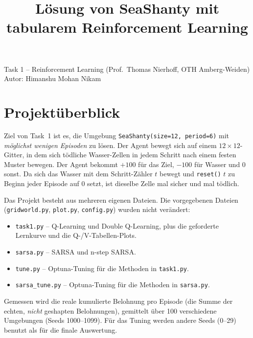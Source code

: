 \documentclass[11pt,a4paper]{article}
\title{\vspace{-1.2cm}\bfseries\color{black}
       L\"osung von SeaShanty mit tabularem Reinforcement Learning}
\author{}
\date{}
\begin{document}
\maketitle
\vspace{-2.2cm}
{\color{black!60}Task 1 -- Reinforcement Learning (Prof.\ Thomas Nierhoff, OTH Amberg-Weiden)\\
Autor: Himanshu Mohan Nikam}
\vspace{6pt}

\section{Projekt\"uberblick}
Ziel von Task~1 ist es, die Umgebung \texttt{SeaShanty(size=12, period=6)} mit
\emph{m\"oglichst wenigen Episoden} zu l\"osen. Der Agent bewegt sich auf einem
$12\times12$-Gitter, in dem sich t\"odliche \glqq Wasser\grqq{}-Zellen in jedem Schritt
nach einem festen Muster bewegen. Der Agent bekommt $+100$ f\"ur das Ziel,
$-100$ f\"ur Wasser und $0$ sonst. Da sich das Wasser mit dem Schritt-Z\"ahler $t$
bewegt und \texttt{reset()} $t$ zu Beginn jeder Episode auf $0$ setzt, ist dieselbe
Zelle mal sicher und mal t\"odlich.

Das Projekt besteht aus mehreren eigenen Dateien. Die vorgegebenen Dateien
(\texttt{gridworld.py}, \texttt{plot.py}, \texttt{config.py}) wurden nicht ver\"andert:
\begin{itemize}
  \item \texttt{task1.py} -- Q-Learning und Double Q-Learning, plus die geforderte
        Lernkurve und die Q-/V-Tabellen-Plots.
  \item \texttt{sarsa.py} -- SARSA und n-step SARSA.
  \item \texttt{tune.py} -- Optuna-Tuning f\"ur die Methoden in \texttt{task1.py}.
  \item \texttt{sarsa\_tune.py} -- Optuna-Tuning f\"ur die Methoden in \texttt{sarsa.py}.
\end{itemize}

Gemessen wird die \glqq reale\grqq{} kumulierte Belohnung pro Episode (die Summe der
echten, \emph{nicht} geshapten Belohnungen), gemittelt \"uber 100 verschiedene
Umgebungen (Seeds 1000--1099). F\"ur das Tuning werden andere Seeds (0--29) benutzt
als f\"ur die finale Auswertung.

\end{document}
